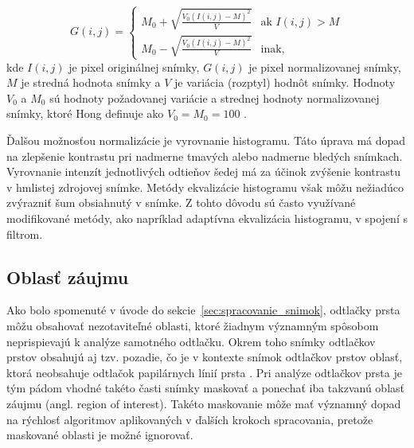   \begin{equation}
    G(i,j) =
    \begin{cases}
      M_0 + \sqrt{\frac{V_0 (I(i,j)-M)^2}{V}}  & \text{ak } I(i,j) > M \\
      M_0 - \sqrt{\frac{V_0 (I(i,j)-M)^2}{V}} & \text{inak,}
    \end{cases}
    \label{eq:normalizacia_Hong}
  \end{equation}
  kde $I(i,j)$ je pixel originálnej snímky, $G(i,j)$ je pixel normalizovanej snímky, $M$ je stredná hodnota snímky a $V$ je variácia (rozptyl) hodnôt snímky.
  Hodnoty $V_0$ a $M_0$ sú hodnoty požadovanej variácie a strednej hodnoty normalizovanej snímky, ktoré Hong definuje ako $V_0 = M_0 = 100$ \cite{Hong}.

  Ďalšou možnosťou normalizácie je vyrovnanie histogramu. Táto úprava má dopad na zlepšenie kontrastu pri nadmerne tmavých
  alebo nadmerne bledých snímkach. Vyrovnanie intenzít jednotlivých odtieňov šedej má za účinok zvýšenie kontrastu v hmlistej zdrojovej snímke.
  Metódy ekvalizácie histogramu však môžu nežiadúco zvýrazniť šum obsiahnutý v snímke. Z tohto dôvodu sú často využívané modifikované metódy,
  ako napríklad adaptívna ekvalizácia histogramu, v spojení s filtrom.

  \subsection{Oblasť záujmu}
  Ako bolo spomenuté v úvode do sekcie~{\ref{sec:spracovanie_snimok}}, odtlačky prsta môžu obsahovať nezotaviteľné oblasti, ktoré žiadnym významným spôsobom
  neprispievajú k analýze samotného odtlačku. Okrem toho snímky odtlačkov prstov obsahujú aj tzv. pozadie, čo je v kontexte snímok odtlačkov prstov oblasť,
  ktorá neobsahuje odtlačok papilárnych línií prsta \cite{Handbook}. Pri analýze odtlačkov prsta je tým pádom vhodné takéto časti snímky maskovať a ponechať
  iba takzvanú oblasť záujmu (angl. region of interest). Takéto maskovanie môže mať významný dopad na rýchlosť algoritmov aplikovaných v ďalších krokoch
  spracovania, pretože maskované oblasti je možné ignorovať.

